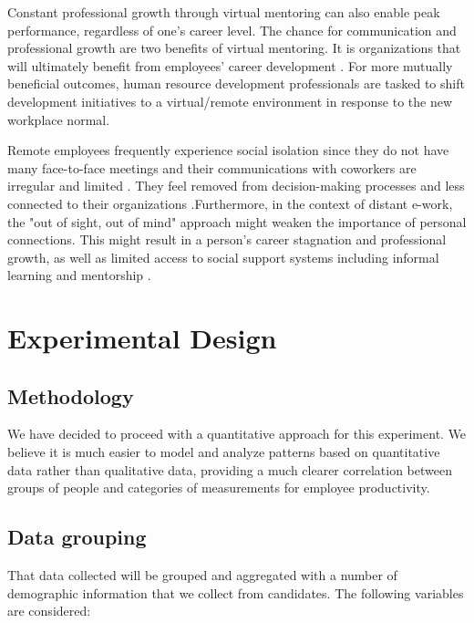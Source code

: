 \documentclass[12pt]{article}
\begin{document}
Constant professional growth through virtual mentoring can also enable peak performance, regardless of one's career level. The chance for communication and professional growth are two benefits of virtual mentoring. It is organizations that will ultimately benefit from employees’ career development \cite{Yarberry2021}.  For more mutually beneficial outcomes, human resource development professionals are tasked to shift development initiatives to a virtual/remote environment in response to the new workplace normal.

Remote employees frequently experience social isolation since they do not have many face-to-face meetings and their communications with coworkers are irregular and limited \cite{Park2021}. They feel removed from decision-making processes and less connected to their organizations \cite{Virick2010}.Furthermore, in the context of distant e-work, the "out of sight, out of mind" approach might weaken the importance of personal connections. This might result in a person's career stagnation and professional growth, as well as limited access to social support systems including informal learning and mentorship \cite{Smith2018}.

\section*{Experimental Design}

\subsection*{Methodology}
We have decided to proceed with a quantitative approach for this experiment. We believe it is much easier to model and analyze patterns based on quantitative data rather than qualitative data, providing a much clearer correlation between groups of people and categories of measurements for employee productivity.

\subsection*{Data grouping}

That data collected will be grouped and aggregated with a number of demographic information that we collect from candidates. The following variables are considered:
\end{document}
